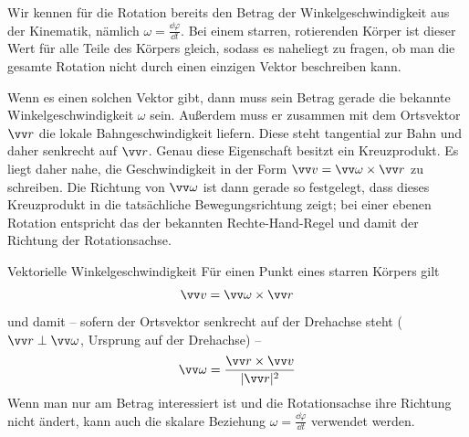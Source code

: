 Wir kennen für die Rotation bereits den Betrag der Winkelgeschwindigkeit aus der Kinematik, nämlich $\omega = \frac{\dd\varphi}{\dd t}$. Bei einem starren, rotierenden Körper ist dieser Wert für alle Teile des Körpers gleich, sodass es naheliegt zu fragen, ob man die gesamte Rotation nicht durch einen einzigen Vektor beschreiben kann.

Wenn es einen solchen Vektor gibt, dann muss sein Betrag gerade die bekannte Winkelgeschwindigkeit $\omega$ sein. Außerdem muss er zusammen mit dem Ortsvektor $\ivec{r}$ die lokale Bahngeschwindigkeit liefern. Diese steht tangential zur Bahn und daher senkrecht auf $\ivec{r}$. Genau diese Eigenschaft besitzt ein Kreuzprodukt. Es liegt daher nahe, die Geschwindigkeit in der Form $\ivec{v} = \ivec{\omega} \times \ivec{r}$ zu schreiben. Die Richtung von $\ivec{\omega}$ ist dann gerade so festgelegt, dass dieses Kreuzprodukt in die tatsächliche Bewegungsrichtung zeigt; bei einer ebenen Rotation entspricht das der bekannten Rechte-Hand-Regel und damit der Richtung der Rotationsachse.

\begin{rememberbox}{Vektorielle Winkelgeschwindigkeit}
Für einen Punkt eines starren Körpers gilt
\begin{equation}\label{eq: v_eq_omega_cross_r}
    \ivec{v} = \ivec{\omega} \times \ivec{r}
\end{equation}
und damit -- sofern der Ortsvektor senkrecht auf der Drehachse steht ($\ivec{r} \perp \ivec{\omega}$, Ursprung auf der Drehachse) --
\begin{equation}\label{eq: omega_r_x_v_allgemein}
    \ivec{\omega} = \frac{\ivec{r} \times \ivec{v}}{|\ivec{r}|^2}
\end{equation}
Wenn man nur am Betrag interessiert ist und die Rotationsachse ihre Richtung nicht ändert, kann auch die skalare Beziehung $\omega = \frac{\dd\varphi}{\dd t}$ verwendet werden.
\end{rememberbox}

